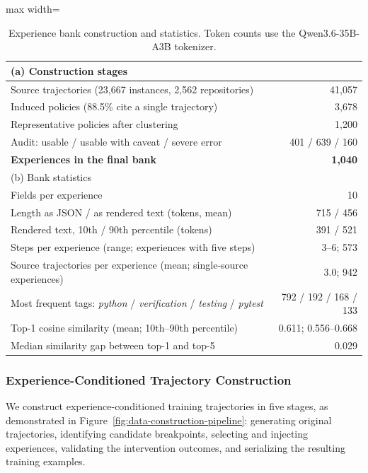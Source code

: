 \begin{table}[htbp]
  \centering
  \caption{Experience bank construction and statistics. Token
  counts use the Qwen3.6-35B-A3B tokenizer.}
  \label{tab:experience-bank}
  \small
  \begin{adjustbox}{max width=\linewidth}
  \begin{tabular}{lr}
    \toprule
    \multicolumn{2}{l}{(a) Construction stages}\\
    \midrule
    Source trajectories (23{,}667 instances, 2{,}562 repositories) & 41{,}057\\
    Induced policies (88.5\% cite a single trajectory) & 3{,}678\\
    Representative policies after clustering & 1{,}200\\
    Audit: usable / usable with caveat / severe error & 401 / 639 / 160\\
    \textbf{Experiences in the final bank} & \textbf{1{,}040}\\
    \midrule
    \multicolumn{2}{l}{(b) Bank statistics}\\
    \midrule
    Fields per experience & 10\\
    Length as JSON / as rendered text (tokens, mean) & 715 / 456\\
    Rendered text, 10th / 90th percentile (tokens) & 391 / 521\\
    Steps per experience (range; experiences with five steps) & 3--6; 573\\
    Source trajectories per experience (mean; single-source experiences) & 3.0; 942\\
    Most frequent tags: \emph{python} / \emph{verification} / \emph{testing} / \emph{pytest} & 792 / 192 / 168 / 133\\
    Top-1 cosine similarity (mean; 10th--90th percentile) & 0.611; 0.556--0.668\\
    Median similarity gap between top-1 and top-5 & 0.029\\
    \bottomrule
  \end{tabular}
  \end{adjustbox}
\end{table}

\subsubsection{Experience-Conditioned Trajectory Construction}

We construct experience-conditioned training trajectories in five stages, as demonstrated in Figure~\ref{fig:data-construction-pipeline}: generating original trajectories, identifying candidate breakpoints, selecting and injecting experiences, validating the intervention outcomes, and serializing the resulting training examples.

